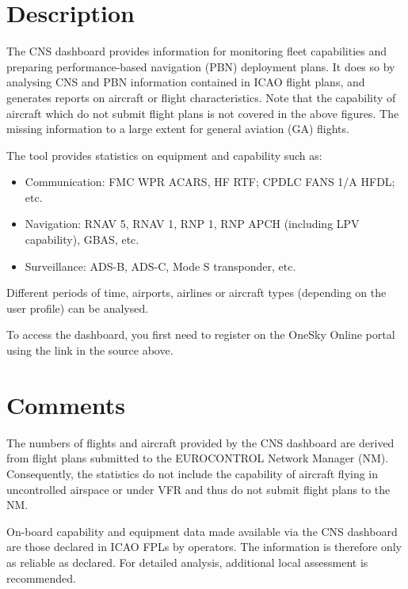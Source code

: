 \documentclass[
  11pt,
  a4paper,
]{book}
\begin{document}
\hypertarget{description-9}{%
\section{Description}\label{description-9}}

The CNS dashboard provides information for monitoring fleet capabilities
and preparing performance-based navigation (PBN) deployment plans. It
does so by analysing CNS and PBN information contained in ICAO flight
plans, and generates reports on aircraft or flight characteristics. Note
that the capability of aircraft which do not submit flight plans is not
covered in the above figures. The missing information to a large extent
for general aviation (GA) flights.

The tool provides statistics on equipment and capability such as:

\begin{itemize}
\item
  Communication: FMC WPR ACARS, HF RTF; CPDLC FANS 1/A HFDL; etc.
\item
  Navigation: RNAV 5, RNAV 1, RNP 1, RNP APCH (including LPV
  capability), GBAS, etc.
\item
  Surveillance: ADS-B, ADS-C, Mode S transponder, etc.
\end{itemize}

Different periods of time, airports, airlines or aircraft types
(depending on the user profile) can be analysed.

To access the dashboard, you first need to register on the OneSky Online
portal using the link in the source above.

\hypertarget{comments-8}{%
\section{Comments}\label{comments-8}}

The numbers of flights and aircraft provided by the CNS dashboard are
derived from flight plans submitted to the EUROCONTROL Network Manager
(NM). Consequently, the statistics do not include the capability of
aircraft flying in uncontrolled airspace or under VFR and thus do not
submit flight plans to the NM.

On-board capability and equipment data made available via the CNS
dashboard are those declared in ICAO FPLs by operators. The information
is therefore only as reliable as declared. For detailed analysis,
additional local assessment is recommended.
\end{document}
